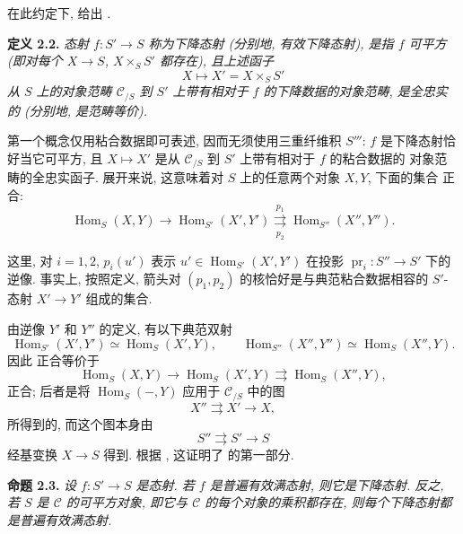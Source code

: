 在此约定下, 给出 .

\medskip
\noindent{}\textbf{定义 2.2.}
\textit{态射 \(f:S'\to S\) 称为\emph{下降态射}
(分别地, \emph{有效下降态射}), 是指 \(f\) 可平方
(即对每个 \(X\to S\), \(X\times_SS'\) 都存在),
且上述函子}
\[
  X\longmapsto X'=X\times_SS'
\]
\textit{从 \(S\) 上的对象范畴 \(\mathscr C_{/S}\) 到
\(S'\) 上带有相对于 \(f\) 的下降数据的对象范畴,
是全忠实的 (分别地, 是范畴等价).}

第一个概念仅用粘合数据即可表述, 因而无须使用三重纤维积 \(S'''\):
\(f\) 是下降态射恰好当它可平方, 且 \(X\mapsto X'\)
是从 \(\mathscr C_{/S}\) 到 \(S'\) 上带有相对于 \(f\) 的粘合数据的
对象范畴的全忠实函子. 展开来说, 这意味着对 \(S\) 上的任意两个对象
\(X,Y\), 下面的集合  正合:
\[
\tag{x}\label{sga3:iv:definition:2:2:eq:x:01}
  \operatorname{Hom}_S(X,Y)
  \longrightarrow \operatorname{Hom}_{S'}(X',Y')
  \overset{p_1}{\underset{p_2}{\rightrightarrows}}
  \operatorname{Hom}_{S''}(X'',Y'').
\]

这里, 对 \(i=1,2\), \(p_i(u')\) 表示
\(u'\in\operatorname{Hom}_{S'}(X',Y')\) 在投影
\(\operatorname{pr}_i:S''\to S'\) 下的逆像. 事实上,
按照定义, 箭头对 \((p_1,p_2)\) 的核恰好是与典范粘合数据相容的
\(S'\)-态射 \(X'\to Y'\) 组成的集合.

由逆像 \(Y'\) 和 \(Y''\) 的定义, 有以下典范双射
\[
  \operatorname{Hom}_{S'}(X',Y')\simeq\operatorname{Hom}_S(X',Y),
  \qquad
  \operatorname{Hom}_{S''}(X'',Y'')\simeq\operatorname{Hom}_S(X'',Y).
\]
因此  正合等价于
\[
\tag{xx}\label{sga3:iv:definition:2:2:eq:xx:01}
  \operatorname{Hom}_S(X,Y)
  \longrightarrow\operatorname{Hom}_S(X',Y)
  \rightrightarrows\operatorname{Hom}_S(X'',Y),
\]
正合; 后者是将 \(\operatorname{Hom}_S(-,Y)\) 应用于
\(\mathscr C_{/S}\) 中的图
\[
\tag{xxx}\label{sga3:iv:definition:2:2:eq:xxx:01}
  X''\rightrightarrows X'\longrightarrow X,
\]
所得到的, 而这个图本身由
\[
  S''\rightrightarrows S'\longrightarrow S
\]
经基变换 \(X\to S\) 得到. 根据 ,
这证明了  的第一部分.

\medskip
\noindent{}\textbf{命题 2.3.}
\textit{设 \(f:S'\to S\) 是态射. 若 \(f\) 是普遍有效满态射,
则它是下降态射. 反之, 若 \(S\) 是 \(\mathscr C\) 的可平方对象,
即它与 \(\mathscr C\) 的每个对象的乘积都存在,
则每个下降态射都是普遍有效满态射.}

